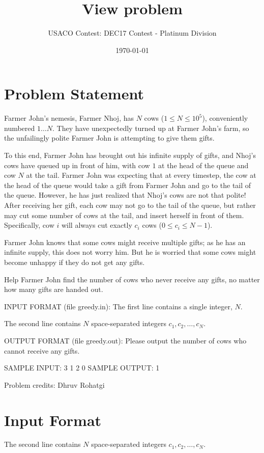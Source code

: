 \documentclass[12pt]{article}
\title{View problem}
\author{USACO Contest: DEC17 Contest - Platinum Division}
\date{\today}
\begin{document}
\maketitle

\section*{Problem Statement}

Farmer John's nemesis, Farmer Nhoj, has $N$ cows ($1 \leq N \leq 10^5$),
conveniently numbered $1 \dots N$. They have unexpectedly turned up at Farmer
John's farm, so the unfailingly polite Farmer John is attempting to give them
gifts.

To this end, Farmer John has brought out his infinite supply of gifts, and
Nhoj's cows have queued up in front of him, with cow $1$ at the head of the
queue and cow $N$ at the tail. Farmer John was expecting that at every timestep,
the cow at the head of the queue would take a gift from Farmer John and go to
the tail of the queue.  However, he has just realized that Nhoj's cows are not
that polite!  After receiving her gift, each cow may not go to the tail of the
queue, but rather may cut some number of cows at the tail, and insert herself in
front of them. Specifically, cow $i$ will always cut exactly $c_i$ cows
($0 \leq c_i \leq N-1$).

Farmer John knows that some cows might receive multiple gifts; as he has an
infinite supply, this does not worry him. But he is worried that some cows might
become unhappy if they do not get any gifts.

Help Farmer John find the number of cows who never receive any gifts, no matter
how many gifts are handed out.

INPUT FORMAT (file greedy.in):
The first line contains a single integer, $N$.

The second line contains $N$ space-separated integers $c_1, c_2, \dots, c_N$.


OUTPUT FORMAT (file greedy.out):
Please output the number of cows who cannot receive any gifts.

SAMPLE INPUT:
3
1 2 0
SAMPLE OUTPUT: 
1


Problem credits: Dhruv Rohatgi



\section*{Input Format}
The second line contains $N$ space-separated integers $c_1, c_2, \dots, c_N$.
\end{document}
